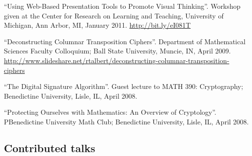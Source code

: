 \documentclass[letterpaper]{article}
\renewenvironment{itemize}{
  \begin{list}{}{
    \setlength{\leftmargin}{1.5em}
	\setlength{\itemsep}{0in}
  }
}{
  \end{list}
}
\begin{document}
\begin{itemize}
	\item ``Using Web-Based Presentation Tools to Promote Visual Thinking''. Workshop given at the Center for Research on Learning and Teaching, University of Michigan, Ann Arbor, MI, January 2011. \url{http://bit.ly/eI081T}
	\item ``Deconstructing Columnar Transposition Ciphers''. Department of Mathematical Sciences Faculty Colloquium; Ball State University, Muncie, IN, April 2009. \url{http://www.slideshare.net/rtalbert/deconstructing-columnar-transposition-ciphers}
	\item ``The Digital Signature Algorithm''. Guest lecture to MATH 390: Cryptography; Benedictine University, Lisle, IL, April 2008.
	\item ``Protecting Ourselves with Mathematics: An Overview of Cryptology''. PBenedictine University Math Club; Benedictine University, Lisle, IL, April 2008.
\end{itemize}

\subsection*{Contributed talks}
\end{document}

